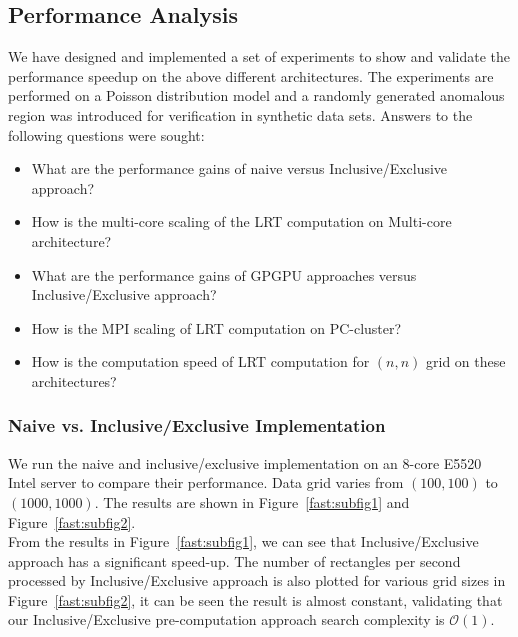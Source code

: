 \documentclass[AMA,LATO1COL]{WileyNJD-v2-bak}
\newcommand\bigo{\mathcal O}
\begin{document}
\subsection{Performance Analysis}
We have designed and implemented a set of experiments to show and validate the performance speedup on the above different architectures. The experiments are performed on a Poisson distribution model and a randomly generated anomalous region was introduced
for verification in synthetic data sets. Answers to the following questions were sought:
\begin{itemize}
\item What are the performance gains of naive versus Inclusive/Exclusive
 approach?
\item How is the multi-core scaling of the LRT computation on Multi-core architecture?
\item What are the performance gains of GPGPU approaches versus Inclusive/Exclusive approach?
\item How is the MPI scaling of LRT computation on PC-cluster?
\item How is the computation speed of LRT computation for $(n,n)$ grid on these architectures?
\end{itemize}

\subsubsection{Naive vs. Inclusive/Exclusive Implementation}
 We run the naive and inclusive/exclusive implementation on an 8-core E5520 Intel server to compare their performance. Data grid varies from $(100,100)$ to $(1000,1000)$. The results are shown in Figure~\ref{fast:subfig1} and Figure~\ref{fast:subfig2}.\\
From the results in Figure~\ref{fast:subfig1}, we can see that Inclusive/Exclusive approach has a significant speed-up. The number of rectangles per second processed by Inclusive/Exclusive approach is also plotted for various grid sizes in Figure~\ref{fast:subfig2}, it can be seen the result is almost constant, validating that our Inclusive/Exclusive pre-computation approach search complexity is $\bigo (1)$.
\end{document}
